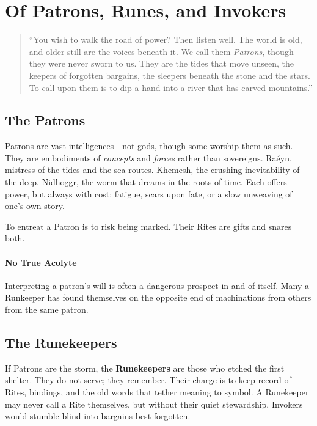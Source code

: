 
\section{Of Patrons, Runes, and Invokers}
\label{sec:invoker-lore}

\begin{quote}
``You wish to walk the road of power? Then listen well. The world is old, and older still are the voices beneath it. We call them \textit{Patrons}, though they were never sworn to us. They are the tides that move unseen, the keepers of forgotten bargains, the sleepers beneath the stone and the stars. To call upon them is to dip a hand into a river that has carved mountains.''
\end{quote}

\subsection{The Patrons}

Patrons are vast intelligences---not gods, though some worship them as such. They are embodiments of \textit{concepts} and \textit{forces} rather than sovereigns. Raéyn, mistress of the tides and the sea-routes. Khemesh, the crushing inevitability of the deep. Nidhoggr, the worm that dreams in the roots of time. Each offers power, but always with cost: fatigue, scars upon fate, or a slow unweaving of one’s own story.

To entreat a Patron is to risk being marked. Their Rites are gifts and snares both.

\paragraph{No True Acolyte}
Interpreting a patron's will is often a dangerous prospect in and of itself. Many a Runkeeper has found themselves on the opposite end of machinations from others from the same patron.

\subsection{The Runekeepers}

If Patrons are the storm, the \textbf{Runekeepers} are those who etched the first shelter. They do not serve; they remember. Their charge is to keep record of Rites, bindings, and the old words that tether meaning to symbol. A Runekeeper may never call a Rite themselves, but without their quiet stewardship, Invokers would stumble blind into bargains best forgotten.

